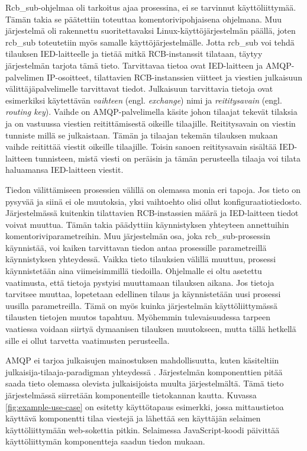 Rcb\_sub-ohjelmaa oli tarkoitus ajaa prosessina, ei se tarvinnut käyttöliittymää. Tämän takia se päätettiin toteuttaa komentorivipohjaisena ohjelmana. Muu järjestelmä oli rakennettu suoritettavaksi Linux-käyttöjärjestelmän päällä, joten rcb\_sub toteutetiin myös samalle käyttöjärjestelmälle. Jotta rcb\_sub voi tehdä tilauksen IED-laitteelle ja tietää mitkä RCB-instanssit tilataan, täytyy järjestelmän tarjota tämä tieto. Tarvittavaa tietoa ovat IED-laitteen ja AMQP-palvelimen IP-osoitteet, tilattavien RCB-instanssien viitteet ja viestien julkaisuun välittäjäpalvelimelle tarvittavat tiedot. Julkaisuun tarvittavia tietoja ovat esimerkiksi käytettävän \emph{vaihteen} (engl. \emph{exchange}) nimi ja \emph{reititysavain} (engl. \emph{routing key}). Vaihde on AMQP-palvelimella käsite johon tilaajat tekevät tilaksia ja on vastuussa viestien reitittämisestä oikeille tilaajille. Reititysavain on viestin tunniste millä se julkaistaan. Tämän ja tilaajan tekemän tilauksen mukaan vaihde reitittää viestit oikeille tilaajille. Toisin sanoen reititysavain sisältää IED-laitteen tunnisteen, mistä viesti on peräisin ja tämän perusteella tilaaja voi tilata haluamansa IED-laitteen viestit.


Tiedon välittämiseen prosessien välillä on olemassa monia eri tapoja. Jos tieto on pysyvää ja siinä ei ole muutoksia, yksi vaihtoehto olisi ollut konfiguraatiotiedosto. Järjestelmässä kuitenkin tilattavien RCB-instassien määrä ja IED-laitteen tiedot voivat muuttua. Tämän takia päädyttiin käynnistyksen yhteyteen annettuihin komentoriviparametreihin. Muu järjestelmän osa, joka rcb\_sub-prosessin käynnistää, voi kaiken tarvittavan tiedon antaa prosessille parametreillä käynnistyksen yhteydessä. Vaikka tieto tilauksien välillä muuttuu, prosessi käynnistetään aina viimeisimmillä tiedoilla. Ohjelmalle ei oltu asetettu vaatimusta, että tietoja pystyisi muuttamaan tilauksen aikana. Jos tietoja tarvitsee muuttaa, lopetetaan edellinen tilaus ja käynnistetään uusi prosessi uusilla parametreilla. Tämä on myös kuinka järjestelmän käyttöliittymässä tilausten tietojen muutos tapahtuu. Myöhemmin tulevaisuudessa tarpeen vaatiessa voidaan siirtyä dymaanisen tilauksen muutokseen, mutta tällä hetkellä sille ei ollut tarvetta vaatimusten perusteella.

AMQP ei tarjoa julkaisujen mainostuksen mahdollisuutta, kuten käsiteltiin julkaisija-tilaaja-paradigman yhteydessä \cite{AMQP-specification}. Järjestelmän komponenttien pitää saada tieto olemassa olevista julkaisijoista muulta järjestelmältä. Tämä tieto järjestelmässä siirretään komponenteille tietokannan kautta. Kuvassa \ref{fig:example-use-case} on esitetty käyttötapaus esimerkki, jossa mittaustietoa käyttävä komponentti tilaa viestejä ja lähettää sen käyttäjän selaimen käyttöliittymään web-sokettia pitkin. Selaimessa JavaScript-koodi päivittää käyttöliittymän komponentteja saadun tiedon mukaan.

